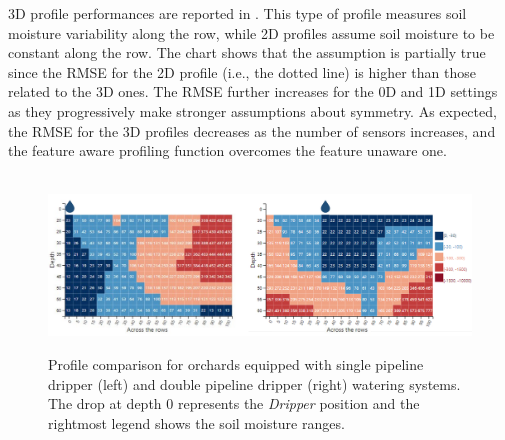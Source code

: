 3D profile performances are reported in . This type of profile measures soil moisture variability along the row, while 2D profiles assume soil moisture to be constant along the row. 
The chart shows that the assumption is partially true since the RMSE for the 2D profile (i.e., the dotted line) is higher than those related to the 3D ones. 
The RMSE further increases for the 0D and 1D settings as they progressively make stronger assumptions about symmetry. 
As expected, the RMSE for the 3D profiles decreases as the number of sensors increases, and the feature aware profiling function overcomes the feature unaware one.

\begin{figure}[t]
\centering\
\includegraphics[scale=.13]{chapters/physics-aware/pluto/img/single-double-pipeline.pdf}
\caption{Profile comparison for orchards equipped with single pipeline dripper (left) and double pipeline dripper (right) watering systems. The drop at depth $0$ represents the \textit{Dripper} position and the rightmost legend shows the soil moisture ranges.}
\label{pluto-fig:pipeline-comparison}
\end{figure}

